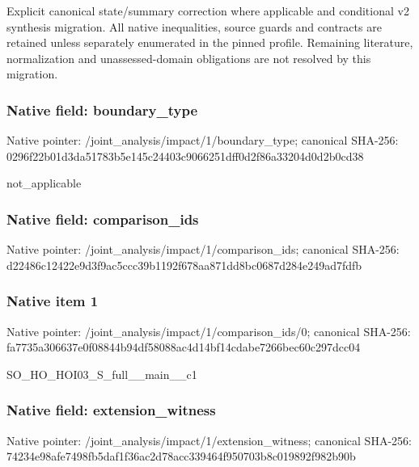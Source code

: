 \documentclass[10pt,a4paper]{article}
\begin{document}
\begingroup\raggedright\sloppy Explicit canonical state/\allowbreak{}summary correction where applicable and conditional v2 synthesis migration. All native inequalities,\allowbreak{} source guards and contracts are retained unless separately enumerated in the pinned profile. Remaining literature,\allowbreak{} normalization and unassessed-domain obligations are not resolved by this migration.\par\endgroup

\subsubsection{Native field: boundary\_\allowbreak{}type}
Native pointer: /joint\_\allowbreak{}analysis/impact/1/boundary\_\allowbreak{}type; canonical SHA-256: 0296f22b01d3da51783b5e145c24403c9066251dff0d2f86a33204d0d2b0cd38

\begingroup\raggedright\sloppy not\_\allowbreak{}applicable\par\endgroup

\subsubsection{Native field: comparison\_\allowbreak{}ids}
Native pointer: /joint\_\allowbreak{}analysis/impact/1/comparison\_\allowbreak{}ids; canonical SHA-256: d22486c12422e9d3f9ac5ccc39b1192f678aa871dd8bc0687d284e249ad7fdfb

\subsubsection{Native item 1}
Native pointer: /joint\_\allowbreak{}analysis/impact/1/comparison\_\allowbreak{}ids/0; canonical SHA-256: fa7735a306637e0f08844b94df58088ac4d14bf14cdabe7266bec60c297dcc04

\begingroup\raggedright\sloppy SO\_\allowbreak{}HO\_\allowbreak{}HOI03\_\allowbreak{}S\_\allowbreak{}full\_\allowbreak{}\_\allowbreak{}main\_\allowbreak{}\_\allowbreak{}c1\par\endgroup

\subsubsection{Native field: extension\_\allowbreak{}witness}
Native pointer: /joint\_\allowbreak{}analysis/impact/1/extension\_\allowbreak{}witness; canonical SHA-256: 74234e98afe7498fb5daf1f36ac2d78acc339464f950703b8c019892f982b90b
\end{document}
